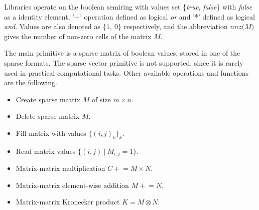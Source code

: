 Libraries operate on the boolean semiring with values set \{\textit{true}, \textit{false}\} with \textit{false} as a identity element, '+' operation defined as logical \textit{or} and '*' defined as logical \textit{and}.
Values are also denoted as $\{1,~0\}$ respectively, and the abbreviation $\textit{nnz(M)}$ gives the number of non-zero cells of the matrix $M$.

The main primitive is a sparse matrix of boolean values, stored in one of the sparse formats.
The sparse vector primitive is not supported, since it is rarely used in practical computational tasks.
Other available operations and functions are the following.


\begin{itemize}
    \item Create sparse matrix $M$ of size $m \times n$.
    \item Delete sparse matrix $M$.
    \item Fill matrix with values $\{(i,j)_k\}_k$.
    \item Read matrix values $\{(i, j)~|~M_{i,j} = 1\}$.
    \item Matrix-matrix multiplication $C \mathrel{+}= M \times N$.
    \item Matrix-matrix element-wise addition $M \mathrel{+}= N$.
    \item Matrix-matrix Kronecker product $K = M \otimes N$.
\end{itemize}